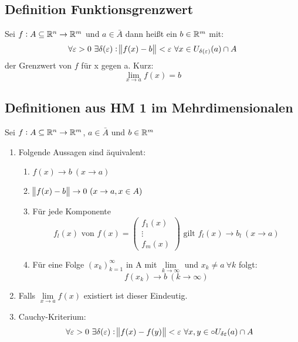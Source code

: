 \subsection{Definition Funktionsgrenzwert}
Sei $f: A \subseteq \mathbb{R}^n \rightarrow \mathbb{R}^m$ und $a \in \bar{A}$ dann heißt ein
$b \in \mathbb{R}^m$ mit:
\begin{equation*}
    \forall \varepsilon>0\ \exists \delta(\varepsilon):
    \norm{f(x) - b}<\varepsilon\
    \forall x \in U_{\delta(\varepsilon)}(a) \cap A
\end{equation*}
der Grenzwert von $f$ für x gegen a. Kurz:
\begin{equation*}
    \lim_{x \rightarrow a} f(x) = b
\end{equation*}

\subsection{Definitionen aus HM 1 im Mehrdimensionalen}
Sei $f: A \subseteq \mathbb{R}^n \rightarrow \mathbb{R}^m$, $a \in \bar{A}$ und $b \in \mathbb{R}^m$
\begin{enumerate}[label= (\alph*)]
    \item Folgende Aussagen sind äquivalent:
        \begin{enumerate}
            \item $f(x) \rightarrow  b\ (x \rightarrow a)$
            \item $\norm{f(x) - b} \rightarrow 0\ (x \rightarrow a, x \in A)$
            \item Für jede Komponente
                \begin{equation*}
                    f_l(x) \text{ von } f(x) =
                    \begin{pmatrix}
                        f_1(x)\\
                        \vdots \\
                        f_m(x)
                    \end{pmatrix}
                    \text{ gilt }
                    f_l(x) \rightarrow b_l\ (x \rightarrow a)
                \end{equation*}
            \item Für eine Folge ${(x_k)}_{k=1}^\infty$ in A mit
                $\lim\limits_{k \rightarrow \infty}$ und $x_k \neq a\ \forall k$ folgt:
                \begin{equation*}
                        f(x_k) \rightarrow b\ (k \rightarrow \infty)
                \end{equation*}
        \end{enumerate}
    \item Falls $\lim\limits_{x \rightarrow a} f(x)$ existiert ist dieser
        Eindeutig.
    \item Cauchy-Kriterium:
        \begin{equation*}
            \forall \varepsilon > 0\ \exists \delta(\varepsilon):
            \norm{f(x) -f(y)}<\varepsilon\ \forall x,y \in
            \circ{U}_{\delta{\varepsilon}}(a) \cap A
        \end{equation*}
\end{enumerate}
